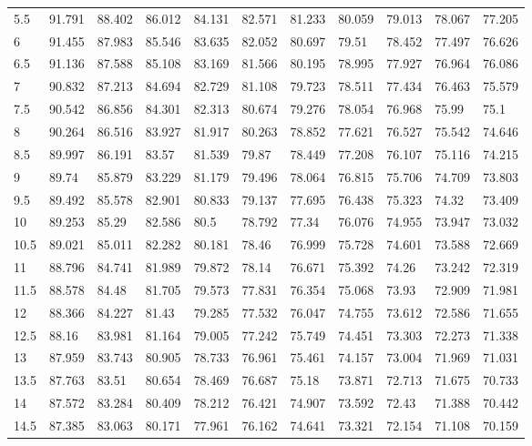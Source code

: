 \begin{bibunit}
\begin{table}[]
\begin{tabular}{lllllllllll}
		5.5  & 91.791 & 88.402 & 86.012 & 84.131 & 82.571 & 81.233 & 80.059 & 79.013 & 78.067 & 77.205 \\
		6    & 91.455 & 87.983 & 85.546 & 83.635 & 82.052 & 80.697 & 79.51  & 78.452 & 77.497 & 76.626 \\
		6.5  & 91.136 & 87.588 & 85.108 & 83.169 & 81.566 & 80.195 & 78.995 & 77.927 & 76.964 & 76.086 \\
		7    & 90.832 & 87.213 & 84.694 & 82.729 & 81.108 & 79.723 & 78.511 & 77.434 & 76.463 & 75.579 \\
		7.5  & 90.542 & 86.856 & 84.301 & 82.313 & 80.674 & 79.276 & 78.054 & 76.968 & 75.99  & 75.1   \\
		8    & 90.264 & 86.516 & 83.927 & 81.917 & 80.263 & 78.852 & 77.621 & 76.527 & 75.542 & 74.646 \\
		8.5  & 89.997 & 86.191 & 83.57  & 81.539 & 79.87  & 78.449 & 77.208 & 76.107 & 75.116 & 74.215 \\
		9    & 89.74  & 85.879 & 83.229 & 81.179 & 79.496 & 78.064 & 76.815 & 75.706 & 74.709 & 73.803 \\
		9.5  & 89.492 & 85.578 & 82.901 & 80.833 & 79.137 & 77.695 & 76.438 & 75.323 & 74.32  & 73.409 \\
		10   & 89.253 & 85.29  & 82.586 & 80.5   & 78.792 & 77.34  & 76.076 & 74.955 & 73.947 & 73.032 \\
		10.5 & 89.021 & 85.011 & 82.282 & 80.181 & 78.46  & 76.999 & 75.728 & 74.601 & 73.588 & 72.669 \\
		11   & 88.796 & 84.741 & 81.989 & 79.872 & 78.14  & 76.671 & 75.392 & 74.26  & 73.242 & 72.319 \\
		11.5 & 88.578 & 84.48  & 81.705 & 79.573 & 77.831 & 76.354 & 75.068 & 73.93  & 72.909 & 71.981 \\
		12   & 88.366 & 84.227 & 81.43  & 79.285 & 77.532 & 76.047 & 74.755 & 73.612 & 72.586 & 71.655 \\
		12.5 & 88.16  & 83.981 & 81.164 & 79.005 & 77.242 & 75.749 & 74.451 & 73.303 & 72.273 & 71.338 \\
		13   & 87.959 & 83.743 & 80.905 & 78.733 & 76.961 & 75.461 & 74.157 & 73.004 & 71.969 & 71.031 \\
		13.5 & 87.763 & 83.51  & 80.654 & 78.469 & 76.687 & 75.18  & 73.871 & 72.713 & 71.675 & 70.733 \\
		14   & 87.572 & 83.284 & 80.409 & 78.212 & 76.421 & 74.907 & 73.592 & 72.43  & 71.388 & 70.442 \\
		14.5 & 87.385 & 83.063 & 80.171 & 77.961 & 76.162 & 74.641 & 73.321 & 72.154 & 71.108 & 70.159 \\

\end{tabular}
\end{table}
\end{bibunit}
